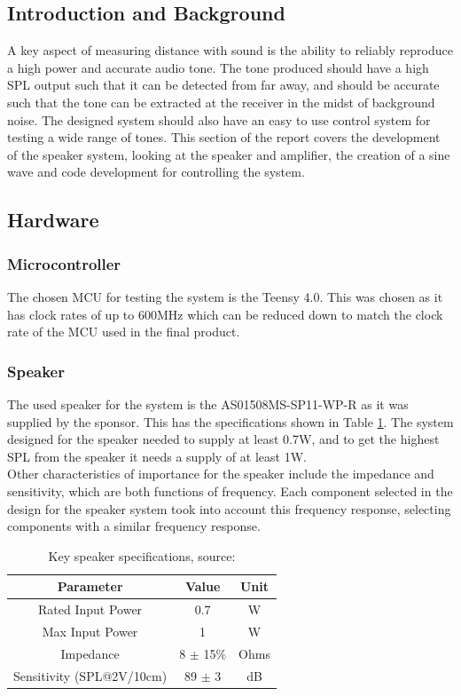 \subsection{Introduction and Background}
A key aspect of measuring distance with sound is the ability to reliably reproduce a high power and accurate audio tone. The tone produced should have a high SPL output such that it can be detected from far away, and should be accurate such that the tone can be extracted at the receiver in the midst of background noise. The designed system should also have an easy to use control system for testing a wide range of tones. This section of the report covers the development of the speaker system, looking at the speaker and amplifier, the creation of a sine wave and code development for controlling the system.\\
\subsection{Hardware}
\subsubsection{Microcontroller}
The chosen MCU for testing the system is the Teensy 4.0. This was chosen as it has clock rates of up to 600MHz which can be reduced down to match the clock rate of the MCU used in the final product.
\subsubsection{Speaker}
The used speaker for the system is the AS01508MS-SP11-WP-R as it was supplied by the sponsor. This has the specifications shown in Table \ref{tab:L_speakerSpecs}.  The system designed for the speaker needed to supply at least 0.7W, and to get the highest SPL from the speaker it needs a supply of at least 1W. \\

Other characteristics of importance for the speaker include the impedance and sensitivity, which are both functions of frequency. Each component selected in the design for the speaker system took into account this frequency response, selecting components with a similar frequency response. \\

\begin{table} [!htb]
	\caption{Key speaker specifications, source: \cite{speakerDatasheet}}
	\label{tab:L_speakerSpecs}
	\centering
	\begin{tabular}{ |c|c|c| }
		\hline
		Parameter & Value & Unit \\ 
		\hline
		Rated Input Power & 0.7 & W \\ 
		Max Input Power & 1 & W \\ 
		Impedance & 8 $\pm$ 15\% & Ohms \\
		Sensitivity (SPL@2V/10cm) & 89 $\pm$ 3 & dB \\
		\hline
	\end{tabular}
\end{table}

